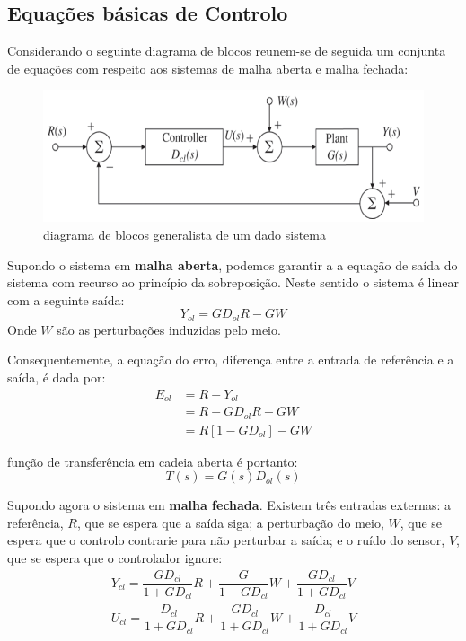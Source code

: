 \subsection[3.1 Equações básicas de Controlo ]{\hspace*{0.075 em}\raisebox{0.2 em}{$\pmb{\drsh}$} Equações básicas de Controlo}
\label{sec:eq-base-control}
\noindent Considerando o seguinte diagrama de blocos reunem-se de seguida um conjunta de equações com respeito aos sistemas de malha aberta e malha fechada:

\begin{figure}[H]
    \centering
    \includegraphics[width = 0.8\linewidth]{img/3/feedback-loop.png}
    \caption{diagrama de blocos generalista de um dado sistema}
    \label{fig:feed-loop}
\end{figure}

\noindent Supondo o sistema em \textbf{malha aberta}, podemos garantir a a equação de saída do sistema com recurso ao princípio da sobreposição. Neste sentido o sistema é linear com a seguinte saída:
$$
    Y_{ol} = G D_{ol} R - G W
$$
\noindent Onde $W$ são as perturbações induzidas pelo meio.

\vspace{1 em}
\noindent Consequentemente, a equação do erro, diferença entre a entrada de referência e a saída, é dada por:
$$
\begin{aligned}
    E_{ol} &= R - Y_{ol}\\
    &= R - G D_{ol} R - G W\\
    &= R[1 - G D_{ol}] - G W
\end{aligned}
$$

\noindent  função de transferência em cadeia aberta é portanto:
$$
    \boxed{T(s) = G(s) D_{ol}(s)}
$$

\noindent Supondo agora o sistema em \textbf{malha fechada}. Existem três entradas externas: a referência, $R$, que se espera que a saída siga; a perturbação do meio, $W$, que se espera que o controlo contrarie para não perturbar a saída; e o ruído do sensor, $V$, que se espera que o controlador ignore:
$$
\begin{aligned}
    Y_{cl} = \dfrac{GD_{cl}}{1 + GD_{cl}}R + \dfrac{G}{1 + GD_{cl}}W + \dfrac{GD_{cl}}{1 + GD_{cl}}V\\
    U_{cl} = \dfrac{D_{cl}}{1 + GD_{cl}}R + \dfrac{GD_{cl}}{1 + GD_{cl}}W + \dfrac{D_{cl}}{1 + GD_{cl}}V
\end{aligned}
$$

